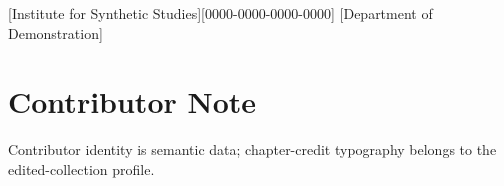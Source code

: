 \documentclass[10pt,twoside,openany]{book}
\begin{document}
[Institute for Synthetic Studies][0000-0000-0000-0000]
[Department of Demonstration]
\PSEBeginFrontMatter
\PSETitlePage
\PSEPublicationPage
\tableofcontents
\clearpage
\PSEBeginBody



\PSEBeginBackMatter
\chapter*{Contributor Note}
Contributor identity is semantic data; chapter-credit typography belongs to the edited-collection profile.
\end{document}
